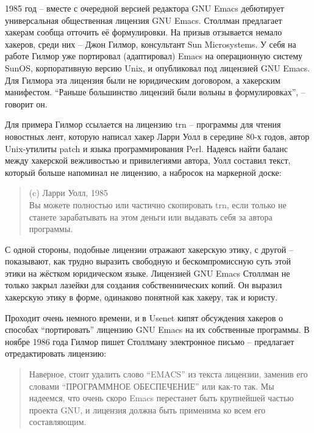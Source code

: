 1985 год -- вместе с очередной версией редактора GNU Emacs дебютирует универсальная общественная лицензия GNU Emacs. Столлман предлагает хакерам сообща отточить её формулировки. На призыв отзывается немало хакеров, среди них -- Джон Гилмор, консультант Sun Microsystems. У себя на работе Гилмор уже портировал (адаптировал) Emacs на операционную систему SunOS, корпоративную версию Unix, и опубликовал под лицензией GNU Emacs. Для Гилмора эта лицензия были не юридическим договором, а хакерским манифестом. \enquote{Раньше большинство лицензий были вольны в формулировках}, -- говорит он.

Для примера Гилмор ссылается на лицензию trn -- программы для чтения новостных лент, которую написал хакер Ларри Уолл в середине 80-х годов, автор Unix-утилиты patch и языка программирования Perl. Надеясь найти баланс между хакерской вежливостью и привилегиями автора, Уолл составил текст, который больше напоминал не лицензию, а набросок на маркерной доске:

\begin{quote}
(c) Ларри Уолл, 1985\\
Вы можете полностью или частично скопировать trn, если только не станете зарабатывать на этом деньги или выдавать себя за автора программы.
\end{quote}

С одной стороны, подобные лицензии отражают хакерскую этику, с другой -- показывают, как трудно выразить свободную и бескомпромиссную суть этой этики на жёстком юридическом языке. Лицензией GNU Emacs Столлман не только закрыл лазейки для создания собственнических копий. Он выразил хакерскую этику в форме, одинаково понятной как хакеру, так и юристу.

Проходит очень немного времени, и в Usenet кипят обсуждения хакеров о способах \enquote{портировать} лицензию GNU Emacs на их собственные программы. В ноябре 1986 года Гилмор пишет Столлману электронное письмо -- предлагает отредактировать лицензию:

\begin{quote}
Наверное, стоит удалить слово \enquote{EMACS} из текста лицензии, заменив его словами \enquote{ПРОГРАММНОЕ ОБЕСПЕЧЕНИЕ} или как-то так. Мы надеемся, что очень скоро Emacs перестанет быть крупнейшей частью проекта GNU, и лицензия должна быть применима ко всем его составляющим.
\end{quote}

